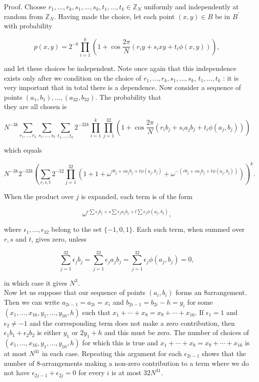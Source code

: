 \documentclass[10pt]{article}
\begin{document}
Proof. Choose $r_{1}, \ldots, r_{k}, s_{1}, \ldots, s_{k}, t_{1}, \ldots, t_{k} \in \mathbb{Z}_{N}$ uniformly and independently at random from $\mathbb{Z}_{N}$. Having made the choice, let each point $(x, y) \in B$ be in $B^{\prime}$ with probability

$$
p(x, y)=2^{-k} \prod_{i=1}^{k}\left(1+\cos \frac{2 \pi}{N}\left(r_{i} y+s_{i} x y+t_{i} \phi(x, y)\right)\right),
$$

and let these choices be independent. Note once again that this independence exists only after we condition on the choice of $r_{1}, \ldots, r_{k}, s_{1}, \ldots, s_{k}$, $t_{1}, \ldots, t_{k}$ : it is very important that in total there is a dependence. Now consider a sequence of points $\left(a_{1}, b_{1}\right), \ldots,\left(a_{32}, b_{32}\right)$. The probability that\\
they are all chosen is

$$
N^{-3 k} \sum_{r_{1}, \ldots, r_{k}} \sum_{s_{1}, \ldots, s_{k}} \sum_{t_{1}, \ldots, t_{k}} 2^{-32 k} \prod_{i=1}^{k} \prod_{j=1}^{32}\left(1+\cos \frac{2 \pi}{N}\left(r_{i} b_{j}+s_{i} a_{j} b_{j}+t_{i} \phi\left(a_{j}, b_{j}\right)\right)\right)
$$

which equals

$$
N^{-3 k} 2^{-32 k}\left(\sum_{r, s, t} 2^{-32} \prod_{j=1}^{32}\left(1+1+\omega^{r b_{j}+s a_{j} b_{j}+t \phi\left(a_{j}, b_{j}\right)}+\omega^{-\left(r b_{j}+s a_{j} b_{j}+t \phi\left(a_{j}, b_{j}\right)\right)}\right)\right)^{k} .
$$

When the product over $j$ is expanded, each term is of the form

$$
\omega^{r \sum \epsilon_{j} b_{j}+s \sum \epsilon_{j} a_{j} b_{j}+t \sum \epsilon_{j} \phi\left(a_{j}, b_{j}\right)},
$$

where $\epsilon_{1}, \ldots, \epsilon_{32}$ belong to the set $\{-1,0,1\}$. Each such term, when summed over $r, s$ and $t$, gives zero, unless

$$
\sum_{j=1}^{32} \epsilon_{j} b_{j}=\sum_{j=1}^{32} \epsilon_{j} a_{j} b_{j}=\sum_{j=1}^{32} \epsilon_{j} \phi\left(a_{j}, b_{j}\right)=0,
$$

in which case it gives $N^{3}$.\\
Now let us suppose that our sequence of points $\left(a_{i}, b_{i}\right)$ forms an 8arrangement. Then we can write $a_{2 i-1}=a_{2 i}=x_{i}$ and $b_{2 i-1}=b_{2 i}-h=y_{i}$ for some $\left(x_{1}, \ldots, x_{16}, y_{1}, \ldots, y_{16}, h\right)$ such that $x_{1}+\cdots+x_{8}=x_{9}+\cdots+x_{16}$. If $\epsilon_{1}=1$ and $\epsilon_{2} \neq-1$ and the corresponding term does not make a zero contribution, then $\epsilon_{1} b_{1}+\epsilon_{2} b_{2}$ is either $y_{1}$ or $2 y_{1}+h$ and this must be zero. The number of choices of $\left(x_{1}, \ldots, x_{16}, y_{1}, \ldots, y_{16}, h\right)$ for which this is true and $x_{1}+\cdots+x_{8}=x_{9}+\cdots+x_{16}$ is at most $N^{31}$ in each case. Repeating this argument for each $\epsilon_{2 i-1}$ shows that the number of 8-arrangements making a non-zero contribution to a term where we do not have $\epsilon_{2 j-1}+\epsilon_{2 j}=0$ for every $i$ is at most $32 N^{31}$.
\end{document}

